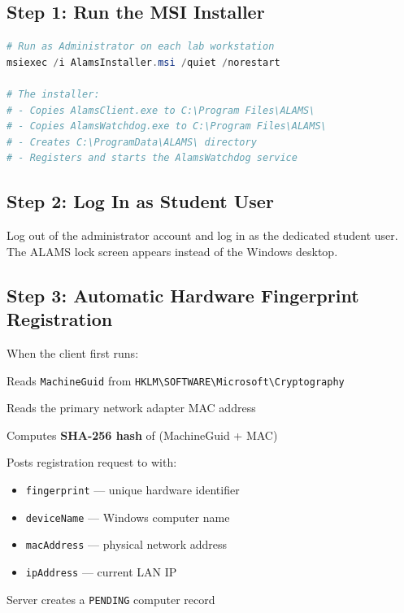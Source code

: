 \subsection{Step 1: Run the MSI Installer}

\begin{tcolorbox}[codebox, title={Install ALAMS on Each Workstation}]
\begin{lstlisting}[language=PowerShell]
# Run as Administrator on each lab workstation
msiexec /i AlamsInstaller.msi /quiet /norestart

# The installer:
# - Copies AlamsClient.exe to C:\Program Files\ALAMS\
# - Copies AlamsWatchdog.exe to C:\Program Files\ALAMS\
# - Creates C:\ProgramData\ALAMS\ directory
# - Registers and starts the AlamsWatchdog service
\end{lstlisting}
\end{tcolorbox}

\subsection{Step 2: Log In as Student User}

Log out of the administrator account and log in as the dedicated student user. The ALAMS lock screen appears instead of the Windows desktop.

\subsection{Step 3: Automatic Hardware Fingerprint Registration}

When the client first runs:
\begin{enumerate}[leftmargin=*, label={\textcolor{aurxonblue}{\faCircle[regular]}}]
  \item Reads \texttt{MachineGuid} from \texttt{HKLM\textbackslash SOFTWARE\textbackslash Microsoft\textbackslash Cryptography}
  \item Reads the primary network adapter MAC address
  \item Computes \textbf{SHA-256 hash} of (MachineGuid + MAC)
  \item Posts registration request to  with:
    \begin{itemize}[label={-}]
      \item \texttt{fingerprint} — unique hardware identifier
      \item \texttt{deviceName} — Windows computer name
      \item \texttt{macAddress} — physical network address
      \item \texttt{ipAddress} — current LAN IP
    \end{itemize}
  \item Server creates a \texttt{PENDING} computer record
\end{enumerate}

